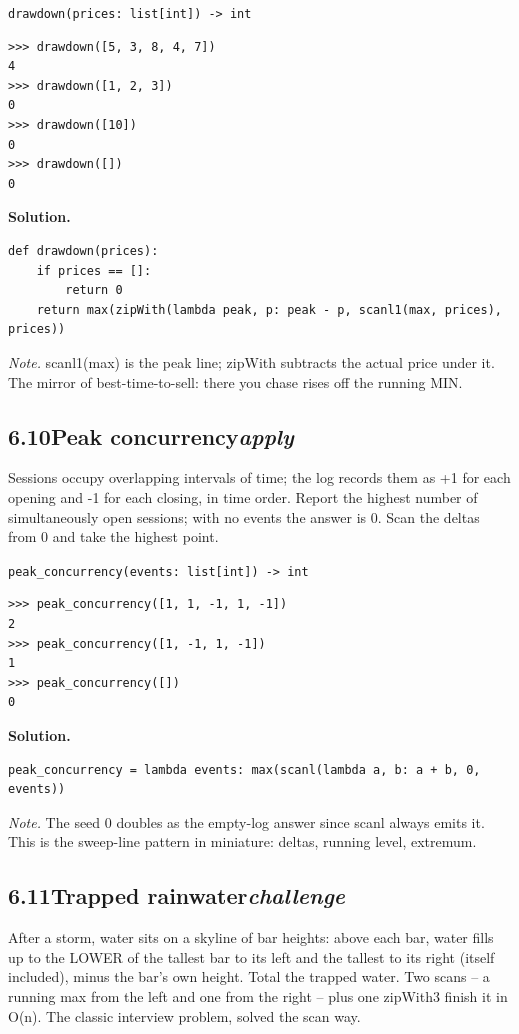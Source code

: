 \documentclass[10pt,letterpaper]{book}
\begin{document}
\noindent\texttt{drawdown(prices: list[int]) -> int}
\begin{lstlisting}[style=ex]
>>> drawdown([5, 3, 8, 4, 7])
4
>>> drawdown([1, 2, 3])
0
>>> drawdown([10])
0
>>> drawdown([])
0
\end{lstlisting}
\noindent\textbf{Solution.}
\begin{lstlisting}[style=code]
def drawdown(prices):
    if prices == []:
        return 0
    return max(zipWith(lambda peak, p: peak - p, scanl1(max, prices), prices))
\end{lstlisting}
\noindent\textit{Note.} scanl1(max) is the peak line; zipWith subtracts the actual price under it. The mirror of best-time-to-sell: there you chase rises off the running MIN.

\subsection*{6.10\quad Peak concurrency\hfill\textnormal{\textit{apply}}}
Sessions occupy overlapping intervals of time; the log records them as +1 for each opening and -1 for each closing, in time order. Report the highest number of simultaneously open sessions; with no events the answer is 0. Scan the deltas from 0 and take the highest point.

\noindent\texttt{peak\_concurrency(events: list[int]) -> int}
\begin{lstlisting}[style=ex]
>>> peak_concurrency([1, 1, -1, 1, -1])
2
>>> peak_concurrency([1, -1, 1, -1])
1
>>> peak_concurrency([])
0
\end{lstlisting}
\noindent\textbf{Solution.}
\begin{lstlisting}[style=code]
peak_concurrency = lambda events: max(scanl(lambda a, b: a + b, 0, events))
\end{lstlisting}
\noindent\textit{Note.} The seed 0 doubles as the empty-log answer since scanl always emits it. This is the sweep-line pattern in miniature: deltas, running level, extremum.

\subsection*{6.11\quad Trapped rainwater\hfill\textnormal{\textit{challenge}}}
After a storm, water sits on a skyline of bar heights: above each bar, water fills up to the LOWER of the tallest bar to its left and the tallest to its right (itself included), minus the bar's own height. Total the trapped water. Two scans -- a running max from the left and one from the right -- plus one zipWith3 finish it in O(n). The classic interview problem, solved the scan way.
\end{document}

